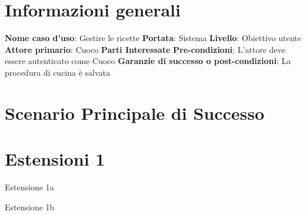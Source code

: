 
\section*{Informazioni generali}
\textbf{Nome caso d'uso}{: Gestire le ricette}\newline
\textbf{Portata}{: Sistema}\newline
\textbf{Livello}{: Obiettivo utente}\newline
\textbf{Attore primario}{: Cuoco}\newline
\textbf{Parti Interessate}\newline
\textbf{Pre-condizioni}{: L'attore deve essere autenticato come Cuoco}\newline
\textbf{Garanzie di successo o post-condizioni}{: La procedura di cucina è salvata}

\section*{Scenario Principale di Successo}

\begin{table}[H]\centering
{}
\end{table}

\section*{Estensioni 1}
\begin{table}[H]\centering\caption{Estensione 1a}
\end{table}

\begin{table}[H]\centering\caption{Estensione 1b}
\end{table}

